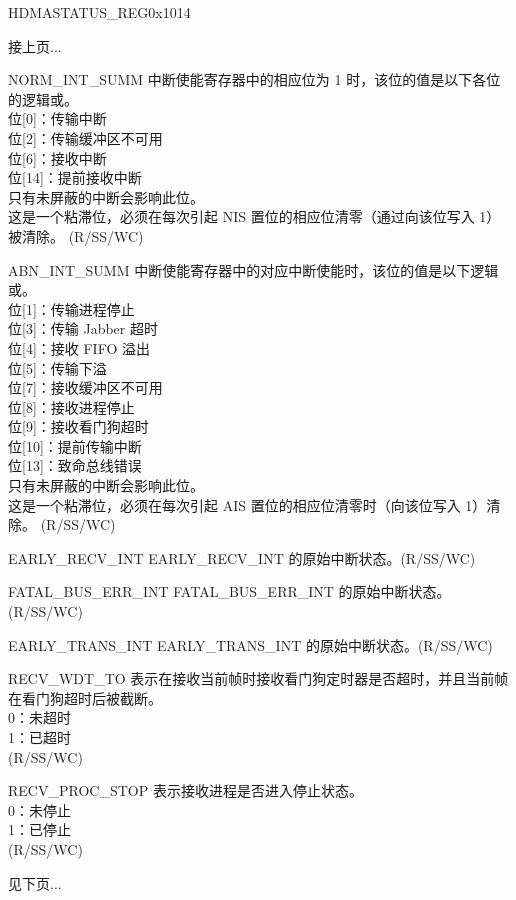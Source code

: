 \begin{register}{H}{DMASTATUS\_REG}{0x1014}
\begin{regdesc}\begin{reglist}
\item [接上页...]

\item [NORM\_INT\_SUMM] 中断使能寄存器中的相应位为 1 时，该位的值是以下各位的逻辑或。\\
位[0]：传输中断\\
位[2]：传输缓冲区不可用\\
位[6]：接收中断\\
位[14]：提前接收中断\\
只有未屏蔽的中断会影响此位。\\这是一个粘滞位，必须在每次引起 NIS 置位的相应位清零（通过向该位写入 1）被清除。 (R/SS/WC)
\item [ABN\_INT\_SUMM] 中断使能寄存器中的对应中断使能时，该位的值是以下逻辑或。\\
位[1]：传输进程停止\\
位[3]：传输 Jabber 超时\\
位[4]：接收 FIFO 溢出\\
位[5]：传输下溢\\
位[7]：接收缓冲区不可用\\
位[8]：接收进程停止\\
位[9]：接收看门狗超时\\
位[10]：提前传输中断\\
位[13]：致命总线错误\\
只有未屏蔽的中断会影响此位。\\
这是一个粘滞位，必须在每次引起 AIS 置位的相应位清零时（向该位写入 1）清除。 (R/SS/WC)
\item [EARLY\_RECV\_INT] EARLY\_RECV\_INT 的原始中断状态。(R/SS/WC)
\item [FATAL\_BUS\_ERR\_INT] FATAL\_BUS\_ERR\_INT 的原始中断状态。(R/SS/WC)
\item [EARLY\_TRANS\_INT] EARLY\_TRANS\_INT 的原始中断状态。(R/SS/WC)
\item [RECV\_WDT\_TO] 表示在接收当前帧时接收看门狗定时器是否超时，并且当前帧在看门狗超时后被截断。\\
0：未超时\\
1：已超时\\(R/SS/WC)
\item [RECV\_PROC\_STOP] 表示接收进程是否进入停止状态。\\
0：未停止\\
1：已停止\\(R/SS/WC)

\item [见下页...]
\end{reglist}\end{regdesc}
\end{register}

